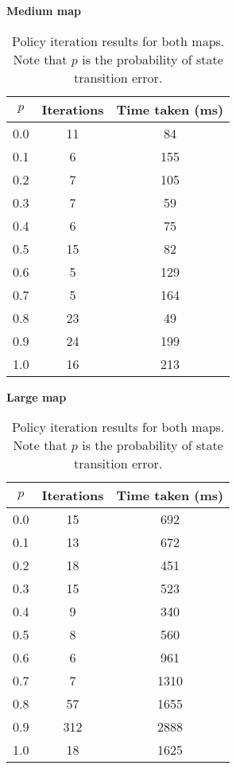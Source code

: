 \begin{table}[!htb]
    \begin{minipage}{0.5\textwidth}
        \centering
        \textbf{Medium map}\\
        \begin{tabular}{@{}c|cc@{}}
        \toprule
        \textbf{$p$} & \textbf{Iterations} & \textbf{Time taken (ms)} \\ \midrule
        0.0     &   11      &    84  \\
        0.1     &   6       &    155  \\
        0.2     &   7       &    105  \\
        0.3     &   7       &    59  \\
        0.4     &   6       &    75  \\
        0.5     &   15      &    82  \\
        0.6     &   5       &    129  \\
        0.7     &   5       &    164  \\
        0.8     &   23      &    49  \\
        0.9     &   24      &    199  \\
        1.0     &   16      &    213  \\ \bottomrule
        \end{tabular}
    \end{minipage}
    \hfillx
    \begin{minipage}{0.5\textwidth}
        \centering
        \textbf{Large map}\\
        \begin{tabular}{@{}c|cc@{}}
        \toprule
        \textbf{$p$} & \textbf{Iterations} & \textbf{Time taken (ms)} \\ \midrule
        0.0     &    15      &   692  \\
        0.1     &    13      &   672  \\
        0.2     &    18      &   451  \\
        0.3     &    15      &   523  \\
        0.4     &    9       &   340  \\
        0.5     &    8       &   560  \\
        0.6     &    6       &   961  \\
        0.7     &    7       &   1310  \\
        0.8     &    57      &   1655  \\
        0.9     &    312     &   2888  \\
        1.0     &    18      &   1625  \\ \bottomrule
        \end{tabular}
    \end{minipage}
    \caption{Policy iteration results for both maps. Note that $p$ is the probability of state transition error.}\label{table:policyitertable}
\end{table}